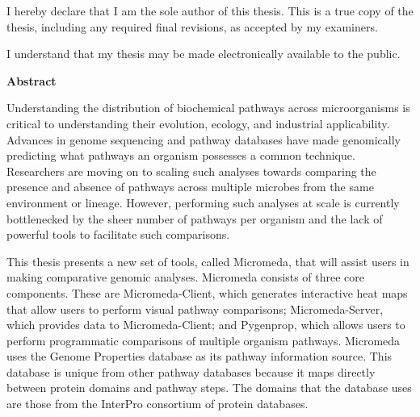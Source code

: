 \cleardoublepage %

  \noindent
I hereby declare that I am the sole author of this thesis. This is a true copy of the thesis, including any required final revisions, as accepted by my examiners.

  \bigskip
  
  \noindent
I understand that my thesis may be made electronically available to the public.

\cleardoublepage


\begin{center}\textbf{Abstract}\end{center}

Understanding the distribution of biochemical pathways across microorganisms is 
critical to understanding their evolution, ecology, and industrial 
applicability. Advances in genome sequencing and pathway databases have made 
genomically predicting what pathways an organism possesses a common technique. 
Researchers are moving on to scaling such analyses towards comparing the 
presence and absence of pathways across multiple microbes from the same 
environment or lineage. However, performing such analyses at scale is currently 
bottlenecked by the sheer number of pathways per organism and the lack of 
powerful tools to facilitate such comparisons. 

This thesis presents a new set of tools, called Micromeda, that will assist 
users in making comparative genomic analyses. Micromeda consists of three core 
components. These are Micromeda-Client, which generates interactive heat maps 
that allow users to perform visual pathway comparisons; Micromeda-Server, which 
provides data to Micromeda-Client; and Pygenprop, which allows users to perform 
programmatic comparisons of multiple organism pathways. Micromeda uses the 
Genome Properties database as its pathway information source. This database is 
unique from other pathway databases because it maps directly between protein 
domains and pathway steps. The domains that the database uses are those from the 
InterPro consortium of protein databases. 

